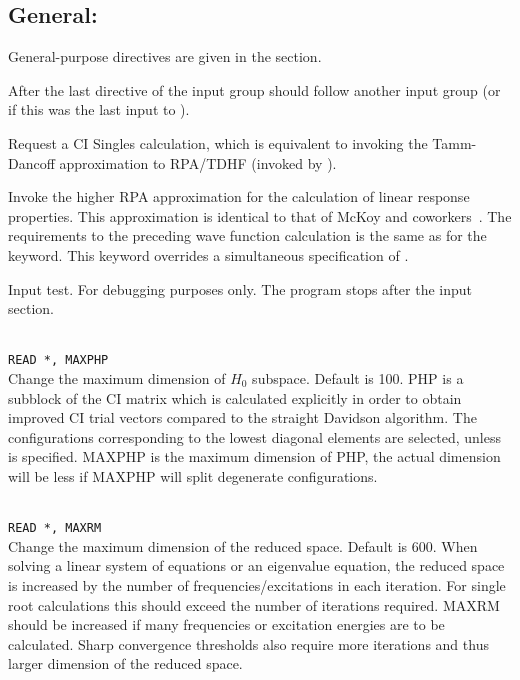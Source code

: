 \subsection{General: }

General-purpose directives are given in the  section.

After the last directive of the  input group
should follow another {} input group
(or  if this was the last input to \dalton).

\begin{description}

\item{}
Request a CI Singles calculation, which is equivalent to invoking the 
Tamm-Dancoff approximation to RPA/TDHF (invoked by ).

\item{}
Invoke the higher RPA approximation for the calculation of linear
response properties.
This approximation is identical to that of McKoy
and coworkers~\cite{jrtsvmjcp58,tsjrvmjcp58}. The requirements to the
preceding wave function
calculation is the same as for the  keyword.
This keyword overrides a simultaneous specification of .

\item{}
Input test. For debugging purposes only. The program stops after the
input section.

\item{}\\
\verb|READ *, MAXPHP|\\
Change the maximum dimension of $H_0$ subspace.   Default is 100.
PHP is a subblock of the CI matrix which is calculated explicitly
in order to obtain improved CI trial vectors compared to the
straight Davidson algorithm\cite{erdjcp17}.  The configurations
corresponding to
the lowest diagonal elements are selected, unless  is
specified. MAXPHP is the maximum dimension of PHP, the
actual dimension will be less if MAXPHP will split degenerate configurations.

\item{}\\
\verb|READ *, MAXRM |\\
Change the maximum dimension of the reduced space. Default is 600.
When solving a linear system of equations or an eigenvalue equation,
the reduced space is increased by the number of
frequencies/excitations in each iteration. For single root
calculations this should exceed the number of iterations required.
MAXRM should be increased if many frequencies or excitation energies
are to be calculated.
Sharp convergence thresholds also require
more iterations and thus larger dimension of the reduced space.


\end{description}
